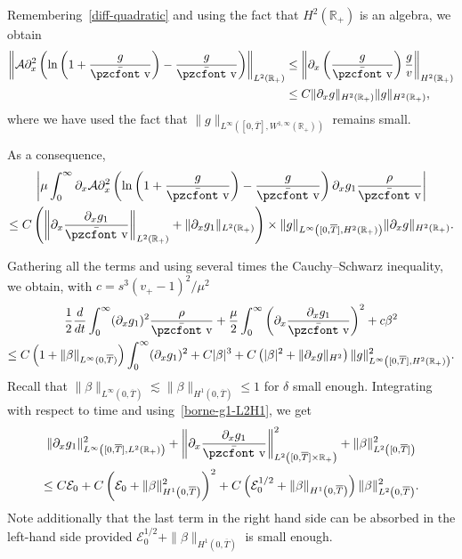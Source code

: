 \documentclass[10pt]{amsart}
\theoremstyle{definition}\newtheorem{defi}[theo]{Definition}\newtheorem{rema}[theo]{Remark}\newtheorem{exam}[theo]{Example}\newtheorem{exem}[theo]{Example}\newtheorem{nota}[theo]{Notation}
\newcommand{\mathpzc}[1]{\text{\pzcfont #1}}
\newcommand{\R}{\mathbb{R}}
\newcommand{\p}{\partial}
\newcommand{\bv}{\bar{\mathpzc{v}}}
\newcommand{\cA}{\mathcal A}
\newcommand{\cE}{\mathcal E}
\begin{document}
\begin{itemize}
Remembering~\eqref{diff-quadratic} and using the fact that $H^2(\R_+)$ is an algebra, we obtain {
\begin{align*}
\left\| \cA \p_x^2 \left(\ln\left(1+ \frac{g}{\bv}\right) - \frac{g}{\bv}\right)\right\|_{L^2(\R_+)}
&\leq \left\| \p_x\left(\frac{g}{\bv}\right) \frac{g}{v}\right\|_{H^2(\R_+)}\\
&\leq C \|\p_x g\|_{H^2(\R_+)} \|g\|_{H^2(\R_+)},
\end{align*}
where we have used the fact that $\|g\|_{L^\infty([0,\overline{T}], W^{1,\infty}(\R_+))}$ remains small. }

As a consequence,
\begin{multline}\label{eq:nonlin-1}
 \left| \mu \int_0^\infty \p_x \cA \p_x^2 \left(\ln\left(1+ \frac{g}{\bv}\right) - \frac{g}{\bv}\right) \p_x g_1 \frac{\rho }{\bv}\right|  \\
\leq C\left(\left\| \p_x \frac{\p_x g_1}{\bv} \right\|_{L^2(\R_+)} + \|\p_x g_1\|_{L^2(\R_+)}\right)\times \| g\|_{L^\infty\left([0, \overline{T}], H^2(\R_+)\right)} \| \p_x g\|_{H^2(\R_+)}.
\end{multline}
\end{itemize}

Gathering all the terms and using several times the Cauchy--Schwarz inequality, we obtain, with $c=s^3(v_+-1)^2/\mu^2$
\begin{multline*}
\frac{1}{2}\frac{d}{dt}\int_0^\infty (\p_x g_1)^2 \frac{\rho}{\bv} + \frac{\mu}{2}\int_0^\infty\left(\p_x \frac{\p_x g_1}{\bv}\right)^2 + c \beta^2\\
\leq C \left(1+ \|\beta\|_{L^\infty(0,\overline{T})}\right)\int_0^\infty (\p_x g_1)^2 + C |\beta|^3 + C \left(|\beta|^2 + \| \p_x g \|_{H^2}\right)\|g\|_{L^\infty\left([0, \overline{T}], H^2(\R_+)\right)}^2.
\end{multline*}
Recall that $\|\beta\|_{L^\infty(0,\overline{T})}\lesssim \|\beta\|_{H^1(0,\overline{T})}\leq 1$ for $\delta$ small enough. Integrating with respect to time and using~\eqref{borne-g1-L2H1}, we get
\begin{multline}\label{est:b}
\|\p_x g_1\|_{L^\infty\left([0,\overline{T}], L^2(\R_+)\right)}^2 + \left\|\p_x \frac{\p_x g_1}{\bv}\right\|^2_{L^2\left([0,\overline{T}]\times \R_+\right)}+ \|\beta\|_{L^2\left([0,\overline{T}]\right)}^2\\
\leq C\cE_0 + C\left(\cE_0 + \|\beta\|_{H^1\left(0,\overline{T}\right)}^2\right)^2 + C\left(\cE_0^{1/2} + \|\beta\|_{H^1\left(0,\overline{T}\right)}\right)\|\beta\|_{L^2\left(0,\overline{T}\right)}^2.
\end{multline}
Note additionally that the last term in the right hand side can be absorbed in the left-hand side provided $\cE_0^{1/2} + \|\beta\|_{H^1(0,\overline{T})}$ is small enough.
\end{document}
